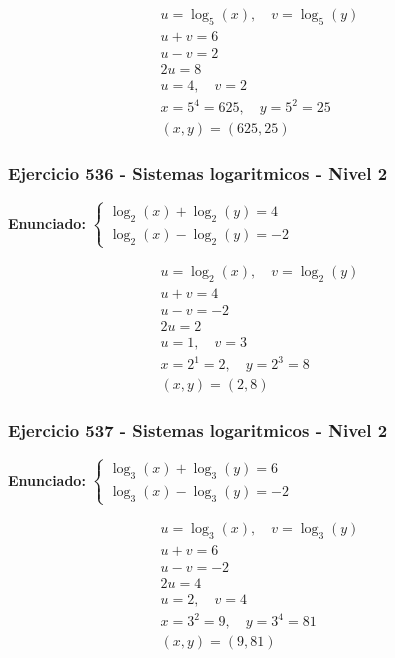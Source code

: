 \documentclass[12pt,a4paper]{article}
\begin{document}
\[
\begin{aligned}
u=\log_{5}\left(x\right),\quad v=\log_{5}\left(y\right)\\
u+v=6\\
u-v=2\\
2u=8\\
u=4,\quad v=2\\
x=5^{4}=625,\quad y=5^{2}=25\\
\boxed{(x,y)=(625,25)}
\end{aligned}
\]


\subsubsection*{Ejercicio 536 - Sistemas logaritmicos - Nivel 2}
\textbf{Enunciado:} \(\begin{cases} \log_{2}\left(x\right)+\log_{2}\left(y\right)=4\\ \log_{2}\left(x\right)-\log_{2}\left(y\right)=-2\end{cases}\)

\[
\begin{aligned}
u=\log_{2}\left(x\right),\quad v=\log_{2}\left(y\right)\\
u+v=4\\
u-v=-2\\
2u=2\\
u=1,\quad v=3\\
x=2^{1}=2,\quad y=2^{3}=8\\
\boxed{(x,y)=(2,8)}
\end{aligned}
\]


\subsubsection*{Ejercicio 537 - Sistemas logaritmicos - Nivel 2}
\textbf{Enunciado:} \(\begin{cases} \log_{3}\left(x\right)+\log_{3}\left(y\right)=6\\ \log_{3}\left(x\right)-\log_{3}\left(y\right)=-2\end{cases}\)

\[
\begin{aligned}
u=\log_{3}\left(x\right),\quad v=\log_{3}\left(y\right)\\
u+v=6\\
u-v=-2\\
2u=4\\
u=2,\quad v=4\\
x=3^{2}=9,\quad y=3^{4}=81\\
\boxed{(x,y)=(9,81)}
\end{aligned}
\]
\end{document}
